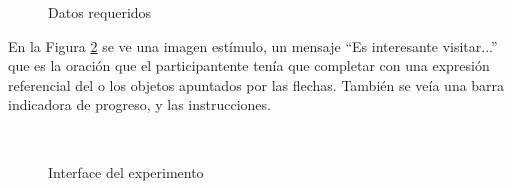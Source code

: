 \begin{figure}[h]
\begin{center}
\caption{Datos requeridos}
\label{fig-nacionalidadGenero}
\end{center}
\end{figure}

En la Figura \ref{fig-interface} se ve una imagen est\'imulo, un mensaje ``Es interesante visitar...'' que es la oraci\'on que el participantente ten\'ia que completar con una expresi\'on referencial del o los objetos apuntados por las flechas. Tambi\'en se ve\'ia una barra indicadora de progreso, y las instrucciones. 

\begin{figure}[ht]
\begin{center}
\\[0pt]
\caption{Interface del experimento}
\label{fig-interface}
\end{center}
\end{figure}


